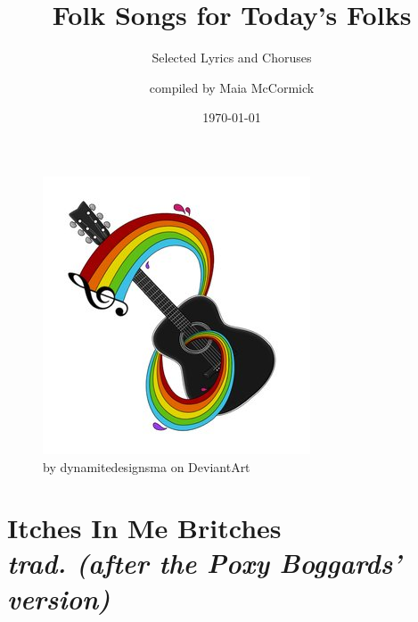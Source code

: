 \documentclass[twoside,13pt,openany,letterpaper]{memoir}%
\title{Folk Songs for Today's Folks}%
\subtitle{Selected Lyrics and Choruses}
\author{compiled by Maia McCormick}%
\date{\today}%
\begin{document}
%
\normalsize%

\newcommand\song[2]{
  \chapter[#1]{#1\\\large\itshape#2}
}
\newcommand\chorusmarker[0]{
	\Large\textit{\textbf{Chorus:}}\normalsize\\
}

%
\maketitle%

\begin{figure}[h]
\vspace{2.0cm}
\centering
\includegraphics[scale=1.2]{coverImg}
\caption{by dynamitedesignsma on DeviantArt}
\end{figure}

\clearpage%
\tableofcontents%
\clearpage%
%


\song{Itches In Me Britches}{trad. (after the Poxy Boggards' version)}
\end{document}
